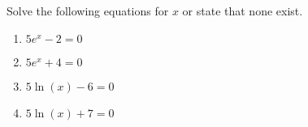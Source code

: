 \documentclass[12pt]{article}
\begin{document}
\addtolength\itemsep{-1mm}

Solve the following equations for $x$ or state that none exist.\\
\begin{multicols}{2}
\begin{enumerate}
\item $5e^x-2=0$\\

\item $5e^x+4=0$\\

\item $5 \ln(x)-6=0$\\

\item $5 \ln(x)+7=0$\\
\end{enumerate}
\end{multicols}
\end{document}

